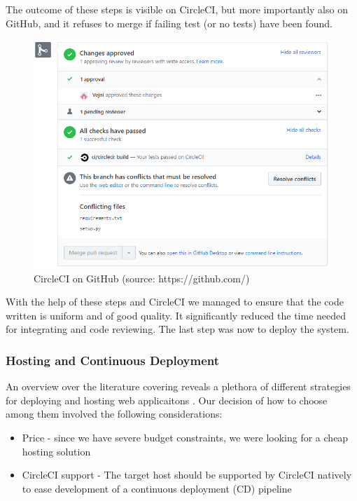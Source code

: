 \documentclass[main.tex]{subfiles}
\begin{document}
The outcome of these steps is visible on CircleCI, but more importantly also on GitHub, and it refuses to merge if failing test (or no tests) have been found.

 \begin{figure}[H]
   \centering
   \includegraphics[scale=0.6]{05Coding/05Pictures/circleCI.png}
   \caption{CircleCI on GitHub (source: https://github.com/)}
   \label{CircleCI}
\end{figure}

With the help of these steps and CircleCI we managed to ensure that the code written is uniform and of good quality. It significantly reduced the time needed for integrating and code reviewing. The last step was now to deploy the system.

\subsubsection{Hosting and Continuous Deployment}
\label{Continuous Deployment}

An overview over the literature covering reveals a plethora of different strategies for deploying and hosting web applicaitons \cite{ConnollyFundamentals}. Our decision of how to choose among them involved the following considerations:

\begin{itemize}
    \item Price - since we have severe budget constraints, we were looking for a cheap hosting solution
    \item CircleCI support - The target host should be supported by CircleCI natively to ease development of a continuous deployment (CD) pipeline
\end{itemize}
\end{document}
